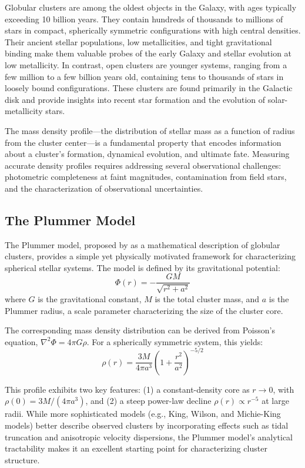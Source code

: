 \documentclass[linenumbers,trackchanges,twocolumn]{aastex701}
\begin{document}
Globular clusters are among the oldest objects in the Galaxy, with ages typically exceeding 10 billion years. They contain hundreds of thousands to millions of stars in compact, spherically symmetric configurations with high central densities. Their ancient stellar populations, low metallicities, and tight gravitational binding make them valuable probes of the early Galaxy and stellar evolution at low metallicity. In contrast, open clusters are younger systems, ranging from a few million to a few billion years old, containing tens to thousands of stars in loosely bound configurations. These clusters are found primarily in the Galactic disk and provide insights into recent star formation and the evolution of solar-metallicity stars.

The mass density profile---the distribution of stellar mass as a function of radius from the cluster center---is a fundamental property that encodes information about a cluster's formation, dynamical evolution, and ultimate fate. Measuring accurate density profiles requires addressing several observational challenges: photometric completeness at faint magnitudes, contamination from field stars, and the characterization of observational uncertainties.

\subsection{The Plummer Model}

The Plummer model, proposed by \citet{plummer1911} as a mathematical description of globular clusters, provides a simple yet physically motivated framework for characterizing spherical stellar systems. The model is defined by its gravitational potential:
\begin{equation}
\Phi(r) = -\frac{GM}{\sqrt{r^2 + a^2}}
\label{eq:plummer_potential}
\end{equation}
where $G$ is the gravitational constant, $M$ is the total cluster mass, and $a$ is the Plummer radius, a scale parameter characterizing the size of the cluster core.

The corresponding mass density distribution can be derived from Poisson's equation, $\nabla^2 \Phi = 4\pi G \rho$. For a spherically symmetric system, this yields:
\begin{equation}
\rho(r) = \frac{3M}{4\pi a^3} \left(1 + \frac{r^2}{a^2}\right)^{-5/2}
\label{eq:plummer_density}
\end{equation}

This profile exhibits two key features: (1) a constant-density core as $r \to 0$, with $\rho(0) = 3M/(4\pi a^3)$, and (2) a steep power-law decline $\rho(r) \propto r^{-5}$ at large radii. While more sophisticated models (e.g., King, Wilson, and Michie-King models) better describe observed clusters by incorporating effects such as tidal truncation and anisotropic velocity dispersions, the Plummer model's analytical tractability makes it an excellent starting point for characterizing cluster structure.
\end{document}
